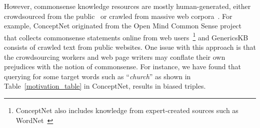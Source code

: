 However, commonsense knowledge resources are mostly human-generated, either crowdsourced from the public~\cite{speer2017conceptnet,sap2019atomic} or crawled from massive web corpora~\cite{bhakthavatsalam2020genericskb}. For example, ConceptNet originated from the Open Mind Common Sense project that collects commonsense statements online from web users~\cite{singh2002open}\footnote{ConceptNet also includes knowledge from expert-created sources such as WordNet~\cite{miller1995wordnet}} and GenericsKB consists of crawled text from public websites. One issue with this approach is that the crowdsourcing workers and web page writers may conflate their own prejudices with the notion of commonsense. 
For instance, we have found that querying for some target words such as ``\emph{church}'' as shown in Table~\ref{motivation_table} in ConceptNet, results in biased triples. 

